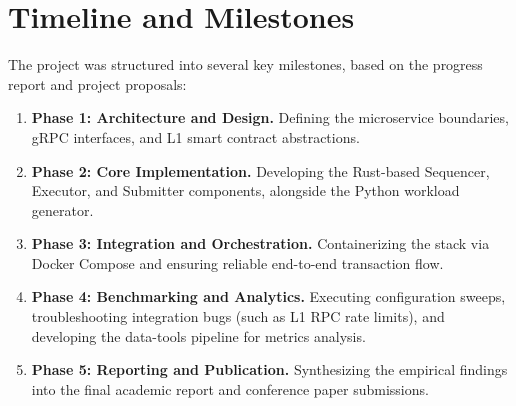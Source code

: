 \section{Timeline and Milestones}
\label{sec:timeline}
The project was structured into several key milestones, based on the progress report and project proposals:
\begin{enumerate}
    \item \textbf{Phase 1: Architecture and Design.} Defining the microservice boundaries, gRPC interfaces, and L1 smart contract abstractions.
    \item \textbf{Phase 2: Core Implementation.} Developing the Rust-based Sequencer, Executor, and Submitter components, alongside the Python workload generator.
    \item \textbf{Phase 3: Integration and Orchestration.} Containerizing the stack via Docker Compose and ensuring reliable end-to-end transaction flow.
    \item \textbf{Phase 4: Benchmarking and Analytics.} Executing configuration sweeps, troubleshooting integration bugs (such as L1 RPC rate limits), and developing the data-tools pipeline for metrics analysis.
    \item \textbf{Phase 5: Reporting and Publication.} Synthesizing the empirical findings into the final academic report and conference paper submissions.
\end{enumerate}